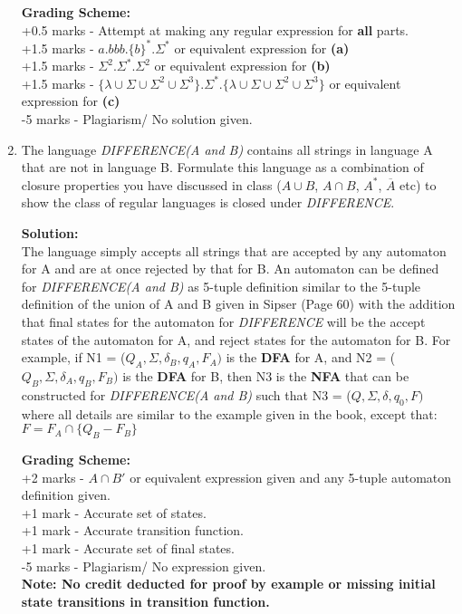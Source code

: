 \documentclass[11pt, article, oneside]{memoir}
\begin{document}
\begin{enumerate}
        \textbf{Grading Scheme:}
        \\+0.5 marks - Attempt at making any regular expression for \textbf{all} parts.
        \\+1.5 marks - \(a.bbb.\{b\}^*.\Sigma^*\) or equivalent expression for \textbf{(a)}
        \\+1.5 marks - \(\Sigma^2.\Sigma^*.\Sigma^2\) or equivalent expression for \textbf{(b)}
        \\+1.5 marks - \(\{\lambda \cup \Sigma \cup \Sigma^2 \cup \Sigma^3\}.\Sigma^*.\{\lambda \cup \Sigma \cup \Sigma^2 \cup \Sigma^3\}\) or equivalent expression for \textbf{(c)}
        \\-5 marks -  Plagiarism/ No solution given.
    \item
        The language \textit{DIFFERENCE(A and B)} contains all strings in language A that are not in language B. Formulate this language as a combination of closure properties you have discussed in class ($A \cup B$, $A \cap B$, $A^*$, $\overline{A}$ etc) to show the class of regular languages is closed under \textit{DIFFERENCE}.
                
        \textbf{Solution:}
        \\The language simply accepts all strings that are accepted by any automaton for A and are at once rejected by that for B. An automaton can be defined  for \textit{DIFFERENCE(A and B)} as 5-tuple definition similar to the 5-tuple definition of the union of A and B given in Sipser (Page 60) with the addition that final states for the automaton for \textit{DIFFERENCE} will be the accept states of the automaton for A, and reject states for the automaton for B. For example, if N1 = (\(Q_A, \Sigma, \delta_B, q_A, F_A)\) is the \textbf{DFA} for A, and N2 = (\(Q_B, \Sigma, \delta_A, q_B, F_B)\) is the \textbf{DFA} for B, then N3 is the \textbf{NFA} that can be constructed for \textit{DIFFERENCE(A and B)} such that N3 = (\(Q, \Sigma, \delta, q_0, F)\) where all details are similar to the example given in the book, except that: \( F = F_A \cap \{Q_B - F_B\} \)

        \textbf{Grading Scheme:}
        \\+2 marks - \(A \cap B'\) or equivalent expression given and any 5-tuple automaton definition given.
        \\+1 mark - Accurate set of states.
        \\+1 mark - Accurate transition function.
        \\+1 mark - Accurate set of final states.
        \\-5 marks -  Plagiarism/ No expression given.
        \\\textbf{Note: No credit deducted for proof by example or missing initial state transitions in transition function.}
        
\end{enumerate}
\end{document}
